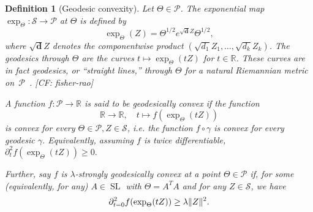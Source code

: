 \documentclass{article}
\newtheorem{definition}{Definition}
\DeclarePairedDelimiter{\norm}{\lVert}{\rVert}
\newcommand{\R}{{\mathbb{R}}}
\renewcommand{\vec}{\bm}
\newcommand\SL{\operatorname{SL}}
\newcommand\Sym{\mathcal{S}}
\newcommand\SPD{\mathcal{P}}
\newcommand\tr{\operatorname{Tr}}
\newcommand{\CF}[1]{{\color{purple}[CF: #1]}}
\begin{document}
\begin{definition}[Geodesic convexity]\label{dfn:g-convexity}
 Let $\Theta \in \SPD$. The \emph{exponential map} $\exp_\Theta:\Sym \to \SPD$ at $\Theta$ is defined by 
$$ \exp_\Theta(Z) = \Theta^{1/2} e^{\sqrt{\vec d}Z} \Theta^{1/2},$$
where $\sqrt{\vec d} Z$ denotes the componentwise product $(\sqrt{d_1} Z_1, \dots, \sqrt{d_k}Z_k)$.
The \emph{geodesics} through $\Theta$ are the curves $t\mapsto \exp_\Theta(tZ)$ for $t \in \R$. These curves are in fact geodesics, or ``straight lines,'' through $\Theta$ for a natural Riemannian metric on~$\SPD$~\cite{bhatia2009positive}. \CF{fisher-rao}


A function $f\colon \SPD \to \R$ is said to be \emph{geodesically convex} if the function 
$$\R \to \R, \quad t \mapsto f (\exp_\Theta( tZ))$$ is convex for every $\Theta \in \SPD, Z \in \Sym$, i.e. the function $f \circ \gamma$ is convex for every geodesic $\gamma$. Equivalently, assuming $f$ is twice differentiable, $\partial^2_t f(\exp_\Theta(tZ)) \geq 0.$ 

Further, say $f$ is \emph{$\lambda$-strongly geodesically convex} at a point $\Theta \in \SPD$ if, for some (equivalently, for any) $A \in \SL$ with $\Theta = A^T A$ and for any $Z \in \Sym$, we have
\begin{align*}
  \partial^2_{t=0} f(\exp_\Theta(tZ)) \geq \lambda \norm{Z}^2.
\end{align*}
\end{definition}
\end{document}
